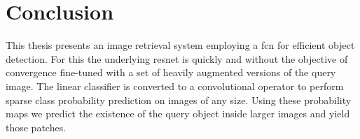 %
\chapter{Conclusion}
\label{sec:conclusion}
This thesis presents an image retrieval system employing a \acrlong{fcn} for efficient object detection. For this the underlying \gls{resnet} is quickly and without the objective of convergence fine-tuned with a set of heavily augmented versions of the query image. The linear classifier is converted to a convolutional operator to perform sparse class probability prediction on images of any size. Using these probability maps we predict the existence of the query object inside larger images and yield those patches.
